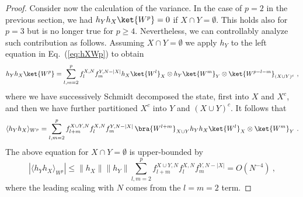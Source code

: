 \documentclass[prx,letterpaper,aps,superscriptaddress,floatfix,twocolumn,nofootinbib]{revtex4-2}
\theoremstyle{definition}
\begin{document}
\begin{proof}
    Consider now the calculation of the variance.
    In the case of $p=2$ in the previous section, we had $h_Y h_X \ket{W^p} = 0$ if $X \cap Y = \emptyset$.
    This holds also for $p = 3$ but is no longer true for $p \geq 4$.
    Nevertheless, we can controllably analyze such contribution as follows.
    Assuming $X \cap Y = \emptyset$ we apply $h_Y$ to the left equation in Eq.~(\ref{eq:hXWp}) to obtain
    \begin{equation}
        h_Y h_X\ket{W^p} = \sum_{l,m=2}^{p} f_{l}^{X,N}f_{m}^{Y,N-|X|} h_X\ket{W^l}_X \otimes h_Y\ket{W^m}_Y \otimes \ket{W^{p-l-m}}_{(X\cup Y)^c} ~,
    \end{equation}
    where we have successively Schmidt decomposed the state, first into $X$ and $X^c$, and then we have further partitioned $X^c$ into $Y$ and $(X \cup Y)^c$.
    It follows that
    \begin{equation}
        \langle h_Y h_X \rangle_{W^p} = \sum_{l,m=2}^p f^{X\cup Y,N}_{l+m}f_{l}^{X,N}f^{Y,N-|X|}_{m} \,
        \bra{W^{l+m}}_{X\cup Y}h_Y h_X \ket{W^l}_X \otimes \ket{W^m}_Y ~.
    \end{equation}
    The above equation for $X \cap Y = \emptyset$ is upper-bounded by
    \begin{equation}
        |\langle h_Y h_X \rangle_{W^p}| \leq \|h_X\| \|h_Y\| \sum_{l,m=2}^p f^{X\cup Y,N}_{l+m}f_{l}^{X,N}f^{Y,N-|X|}_{m} 
        = O(N^{-4}) ~,
        \label{eq:hyhxnooverlap}
    \end{equation}
    where the leading scaling with $N$ comes from the $l = m = 2$ term.


\end{proof}
\end{document}
